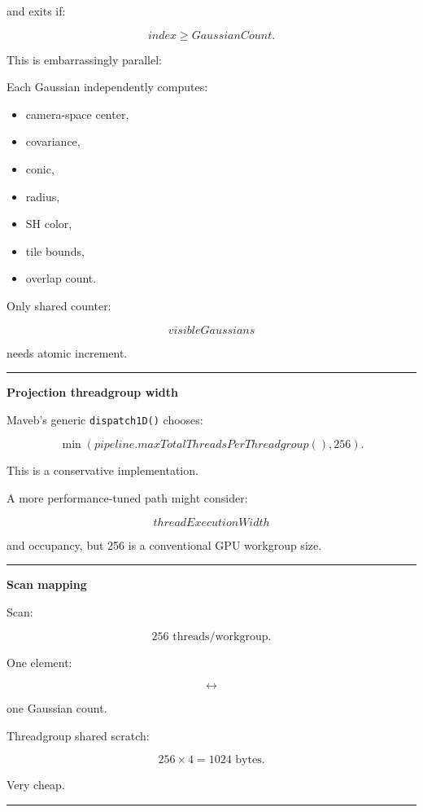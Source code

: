 and exits if:

\[
index\ge GaussianCount.
\]

This is embarrassingly parallel:

Each Gaussian independently computes:

\begin{itemize}
\tightlist
\item
  camera-space center,
\item
  covariance,
\item
  conic,
\item
  radius,
\item
  SH color,
\item
  tile bounds,
\item
  overlap count.
\end{itemize}

Only shared counter:

\[
visibleGaussians
\]

needs atomic increment.

\begin{center}\rule{0.5\linewidth}{0.5pt}\end{center}

\textbf{Projection threadgroup width}

Maveb's generic \texttt{dispatch1D()} chooses:

\[
\min(
pipeline.maxTotalThreadsPerThreadgroup(),
256
).
\]

This is a conservative implementation.

A more performance-tuned path might consider:

\[
threadExecutionWidth
\]

and occupancy, but 256 is a conventional GPU workgroup size.

\begin{center}\rule{0.5\linewidth}{0.5pt}\end{center}

\textbf{Scan mapping}

Scan:

\[
256\text{ threads/workgroup}.
\]

One element:

\[
\leftrightarrow
\]

one Gaussian count.

Threadgroup shared scratch:

\[
256\times4
=
1024\text{ bytes}.
\]

Very cheap.

\begin{center}\rule{0.5\linewidth}{0.5pt}\end{center}

